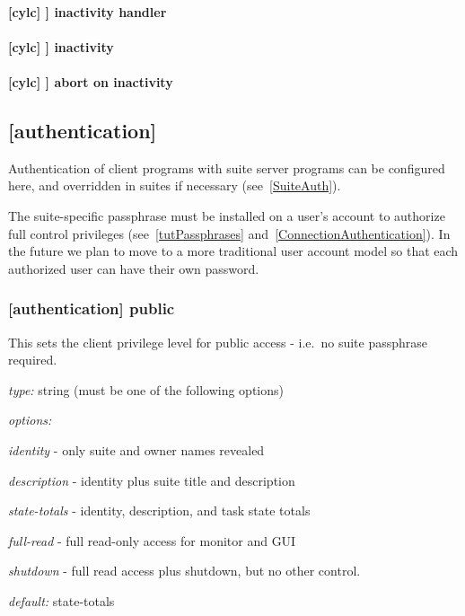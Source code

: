 \paragraph[inactivity handler]{[cylc] \textrightarrow [[events]] \textrightarrow inactivity handler}

\paragraph[inactivity]{[cylc] \textrightarrow [[events]] \textrightarrow inactivity}

\paragraph[abort on inactivity]{[cylc] \textrightarrow [[events]] \textrightarrow abort on inactivity}

\subsection{[authentication]}
\label{GlobalAuth}

Authentication of client programs with suite server programs can be configured
here, and overridden in suites if necessary (see~\ref{SuiteAuth}).

The suite-specific passphrase must be installed on a user's account to
authorize full control privileges (see~\ref{tutPassphrases}
and~\ref{ConnectionAuthentication}). In the future we plan to move to a more
traditional user account model so that each authorized user can have their own
password.

\subsubsection[public]{[authentication] \textrightarrow public}

This sets the client privilege level for public access - i.e.\ no suite passphrase
required.

\begin{myitemize}
\item {\em type:} string (must be one of the following options)
\item {\em options:}
    \begin{myitemize}
        \item {\em identity} - only suite and owner names revealed
        \item {\em description} - identity plus suite title and description
        \item {\em state-totals} - identity, description, and task state totals
        \item {\em full-read} - full read-only access for monitor and GUI
        \item {\em shutdown} - full read access plus shutdown, but no other
            control.
    \end{myitemize}
\item {\em default:} state-totals
\end{myitemize}
